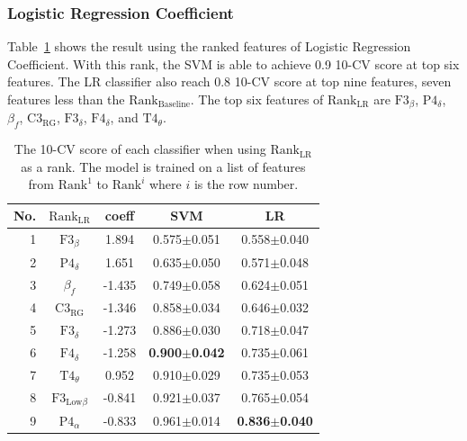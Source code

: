 \documentclass[pdflatex,sn-mathphys]{sn-jnl}%
\theoremstyle{thmstyleone}%
\theoremstyle{thmstyletwo}%
\theoremstyle{thmstylethree}%
\begin{document}
\subsubsection{Logistic Regression Coefficient}

Table~\ref{tab:cv_LR} shows the result using the ranked features of Logistic Regression Coefficient. With this rank, the SVM is able to achieve 0.9 10-CV score at top six features. The LR classifier also reach 0.8 10-CV score at top nine features, seven features less than the $\text{Rank}_{\text{Baseline}}$. The top six features of $\text{Rank}_{\text{LR}}$ are $\text{F3}_{\beta}$, $\text{P4}_{\delta}$, $\beta_{f}$, $\text{C3}_{\text{RG}}$, $\text{F3}_{\delta}$, $\text{F4}_{\delta}$, and $\text{T4}_{\theta}$.

\begin{table}[h!]
\centering
\caption{The 10-CV score of each classifier when using $\text{Rank}_{\text{LR}}$ as a rank. The model is trained on a list of features from $\text{Rank}^1$ to $\text{Rank}^i$ where $i$ is the row number.}
\label{tab:cv_LR}
\begin{tabular}{r|cccc}
\hline
 No. &     $\text{Rank}_{\text{LR}}$ &  coeff &                      SVM &                       LR \\
\hline
   1 &           $\text{F3}_{\beta}$ &  1.894 &          0.575$\pm$0.051 &          0.558$\pm$0.040 \\
   2 &          $\text{P4}_{\delta}$ &  1.651 &          0.635$\pm$0.050 &          0.571$\pm$0.048 \\
   3 &                   $\beta_{f}$ & -1.435 &          0.749$\pm$0.058 &          0.624$\pm$0.051 \\
   4 &       $\text{C3}_{\text{RG}}$ & -1.346 &          0.858$\pm$0.034 &          0.646$\pm$0.032 \\
   5 &          $\text{F3}_{\delta}$ & -1.273 &          0.886$\pm$0.030 &          0.718$\pm$0.047 \\
   6 &          $\text{F4}_{\delta}$ & -1.258 & \textbf{0.900$\pm$0.042} &          0.735$\pm$0.061 \\
   7 &          $\text{T4}_{\theta}$ &  0.952 &          0.910$\pm$0.029 &          0.735$\pm$0.053 \\
   8 & $\text{F3}_{\text{Low}\beta}$ & -0.841 &          0.921$\pm$0.037 &          0.765$\pm$0.054 \\
   9 &          $\text{P4}_{\alpha}$ & -0.833 &          0.961$\pm$0.014 & \textbf{0.836$\pm$0.040} \\

\end{tabular}
\end{table}
\end{document}
